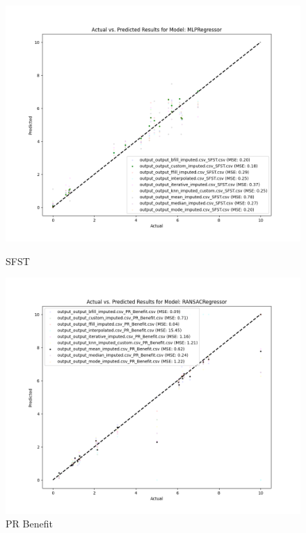 \begin{figure}[H]
    \centering
    \begin{minipage}{0.495\textwidth}
        \centering
        \includegraphics[width=\linewidth]{reg_section_specxtra/images_reg_training/SFST_MLPRegressor_plot.png}
        \caption{SFST}
        \label{fig_reg_specxtra:sfst_reg_training}
    \end{minipage}\hfill
    \begin{minipage}{0.495\textwidth}
        \centering
        \includegraphics[width=\linewidth]{reg_section_specxtra/images_reg_training/PR_Benefit_RANSACRegressor_plot.png}
        \caption{PR Benefit}
        \label{fig_reg_specxtra:pr_ben_reg_training}
    \end{minipage}
\end{figure}

